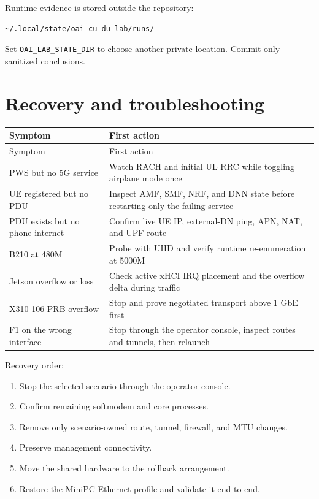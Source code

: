 \documentclass[11pt,a4paper]{article}
\begin{document}
Runtime evidence is stored outside the repository:

\begin{lstlisting}
~/.local/state/oai-cu-du-lab/runs/
\end{lstlisting}

Set \texttt{OAI\_LAB\_STATE\_DIR} to choose another private location. Commit
only sanitized conclusions.

\section{Recovery and troubleshooting}

\begin{longtable}{@{}L{47mm}L{110mm}@{}}
\toprule
Symptom & First action \\
\midrule
\endfirsthead
\toprule
Symptom & First action \\
\midrule
\endhead
PWS but no 5G service & Watch RACH and initial UL RRC while toggling airplane mode once \\
UE registered but no PDU & Inspect AMF, SMF, NRF, and DNN state before restarting only the failing service \\
PDU exists but no phone internet & Confirm live UE IP, external-DN ping, APN, NAT, and UPF route \\
B210 at 480M & Probe with UHD and verify runtime re-enumeration at 5000M \\
Jetson overflow or loss & Check active xHCI IRQ placement and the overflow delta during traffic \\
X310 106 PRB overflow & Stop and prove negotiated transport above 1 GbE first \\
F1 on the wrong interface & Stop through the operator console, inspect routes and tunnels, then relaunch \\
\bottomrule
\end{longtable}

Recovery order:

\begin{enumerate}
  \item Stop the selected scenario through the operator console.
  \item Confirm remaining softmodem and core processes.
  \item Remove only scenario-owned route, tunnel, firewall, and MTU changes.
  \item Preserve management connectivity.
  \item Move the shared hardware to the rollback arrangement.
  \item Restore the MiniPC Ethernet profile and validate it end to end.
\end{enumerate}
\end{document}
